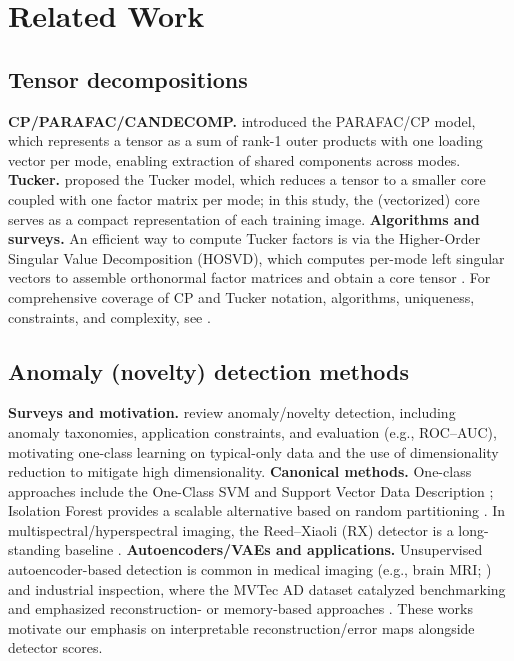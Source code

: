 \documentclass[pdflatex,sn-mathphys-ay]{sn-jnl}
\begin{document}
\section{Related Work}
\subsection{Tensor decompositions}

\textbf{CP/PARAFAC/CANDECOMP.} \citet{Harshman1970} introduced the PARAFAC/CP model, which represents a tensor as a sum of rank-1 outer products with one loading vector per mode, enabling extraction of shared components across modes. 
\textbf{Tucker.} \citet{Tucker1966} proposed the Tucker model, which reduces a tensor to a smaller core coupled with one factor matrix per mode; in this study, the (vectorized) core serves as a compact representation of each training image. 
\textbf{Algorithms and surveys.} An efficient way to compute Tucker factors is via the Higher-Order Singular Value Decomposition (HOSVD), which computes per-mode left singular vectors to assemble orthonormal factor matrices and obtain a core tensor \citep{DeLathauwer2000a}. For comprehensive coverage of CP and Tucker notation, algorithms, uniqueness, constraints, and complexity, see \citet{KoldaBader2009}.

\subsection{Anomaly (novelty) detection methods}
\textbf{Surveys and motivation.} \citet{Chandola2009,Pimentel2014} review anomaly/novelty detection, including anomaly taxonomies, application constraints, and evaluation (e.g., ROC–AUC), motivating one-class learning on typical-only data and the use of dimensionality reduction to mitigate high dimensionality.
\textbf{Canonical methods.} One-class approaches include the One-Class SVM \citep{Scholkopf2001} and Support Vector Data Description \citep{TaxDuin2004}; Isolation Forest provides a scalable alternative based on random partitioning \citep{Liu2008,Liu2012}. In multispectral/hyperspectral imaging, the Reed–Xiaoli (RX) detector is a long-standing baseline \citep{ReedYu1990}. 
\textbf{Autoencoders/VAEs and applications.} Unsupervised autoencoder-based detection is common in medical imaging (e.g., brain MRI; \citep{Baur2021}) and industrial inspection, where the MVTec AD dataset catalyzed benchmarking and emphasized reconstruction- or memory-based approaches \citep{Bergmann2019,Bergmann2021}. These works motivate our emphasis on interpretable reconstruction/error maps alongside detector scores.
\end{document}

